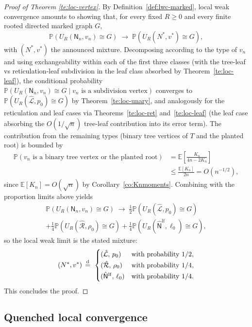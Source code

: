 \documentclass[english,11pt]{smfart}
\newcommand{\Prb}[1]{\mathbb{P}\left(#1\right)}
\newcommand{\Ex}[1]{\mathbb{E}[#1]}
\newcommand{\Exb}[1]{\mathbb{E}\left[#1\right]}
\newcommand{\eqdist}{\,{\buildrel \mathrm{d} \over =}\,}
\newcommand{\cL}{\mathcal{L}}
\newcommand{\cR}{\mathcal{R}}
\newcommand{\mN}{\mathsf{N}}
\numberwithin{equation}{section}
\begin{document}
\begin{proof}[Proof of Theorem \ref{te:loc-vertex}]
\smallskip
By Definition~\ref{def:lwc-marked}, local weak convergence amounts to showing
that, for every fixed \(R\ge 0\) and every finite rooted directed marked
graph $G$,
\[
  \Prb{U_R(\mN_n,v_n)\cong G}\;\longrightarrow\;\Prb{U_R(N^*,v^*)\cong G},
\]
with \((N^*,v^*)\) the announced mixture. Decomposing according to the type of
\(v_n\) and using exchangeability within each of the first three classes
(with the tree-leaf vs reticulation-leaf subdivision in the leaf class
absorbed by Theorem~\ref{te:loc-leaf}), the conditional probability
\(\Prb{U_R(\mN_n,v_n)\cong G\mid v_n\text{ is a subdivision vertex}}\) converges
to \(\Prb{U_R(\hat{\cL},p_0)\cong G}\) by Theorem~\ref{te:loc-unary}, and
analogously for the reticulation and leaf cases via
Theorems~\ref{te:loc-ret} and~\ref{te:loc-leaf} (the leaf case absorbing the
\(O(1/\sqrt n)\) tree-leaf contribution into its error term). The contribution
from the remaining types (binary tree vertices of \(T\) and the planted root)
is bounded by
\begin{align*}
  \Prb{v_n\text{ is a binary tree vertex or the planted root}}
  &=\Exb{\frac{K_n}{4n-2K_n}}
  \\ &\le\frac{\Ex{K_n}}{2n} 
  =O(n^{-1/2}),
\end{align*}
since $\Ex{K_n}=O(\sqrt n)$ by Corollary~\ref{co:Knmoments}. Combining with the
proportion limits above yields
\begin{multline*}
  \Prb{U_R(\mN_n,v_n)\cong G}\;\longrightarrow\;
  \tfrac12\Prb{U_R(\hat{\cL},p_0)\cong G}\\
  +\tfrac14\Prb{U_R(\hat{\cR},\rho_0)\cong G}
  +\tfrac14\Prb{U_R(\hat{\mN}^{\mathrm{lf}},\ell_0)\cong G},
\end{multline*}
so the local weak limit is the stated mixture:
\[
  (N^*,v^*)\;\eqdist\;\begin{cases}
    (\hat{\cL},\,p_0) & \text{with probability } 1/2,\\[2pt]
    (\hat{\cR},\,\rho_0) & \text{with probability } 1/4,\\[2pt]
    (\hat{\mN}^{\mathrm{lf}},\,\ell_0) & \text{with probability } 1/4.
  \end{cases}
\]
This concludes the proof.
\end{proof}




\subsection{Quenched local convergence}
\label{ssec:quenched}
\end{document}
